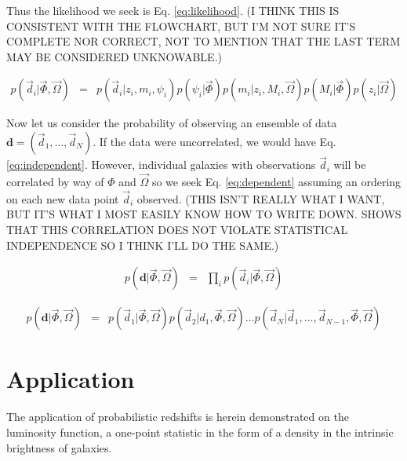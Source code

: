 \documentclass[12pt, onecolumn]{emulateapj}
\begin{document}
Thus the likelihood we seek is Eq. \ref{eq:likelihood}.  (I THINK THIS IS CONSISTENT WITH THE FLOWCHART, BUT I'M NOT SURE IT'S COMPLETE NOR CORRECT, NOT TO MENTION THAT THE LAST TERM MAY BE CONSIDERED UNKNOWABLE.)


\begin{eqnarray}
\label{eq:likelihood}
p(\vec{d}_{i}|\vec{\Phi},\vec{\Omega}) &=& p(\vec{d}_{i}|z_{i},m_{i},\psi_{i})p(\psi_{i}|\vec{\Phi})p(m_{i}|z_{i},M_{i},\vec{\Omega})p(M_{i}|\vec{\Phi})p(z_{i}|\vec{\Omega})
\end{eqnarray}

Now let us consider the probability of observing an ensemble of data $\textbf{d}=(\vec{d}_{1},\dots,\vec{d}_{N})$.  If the data were uncorrelated, we would have Eq. \ref{eq:independent}.  However, individual galaxies with observations $\vec{d}_{i}$ will be correlated by way of $\Phi$ and $\vec{\Omega}$ so we seek Eq. \ref{eq:dependent} assuming an ordering on each new data point $\vec{d}_{i}$ observed.  (THIS ISN'T REALLY WHAT I WANT, BUT IT'S WHAT I MOST EASILY KNOW HOW TO WRITE DOWN.  \citet{for14} SHOWS THAT THIS CORRELATION DOES NOT VIOLATE STATISTICAL INDEPENDENCE SO I THINK I'LL DO THE SAME.)

\begin{eqnarray}
\label{eq:independent}
p(\textbf{d}|\vec{\Phi},\vec{\Omega}) &=& \prod_{i}p(\vec{d}_{i}|\vec{\Phi},\vec{\Omega})
\end{eqnarray}

\begin{eqnarray}
\label{eq:dependent}
p(\textbf{d}|\vec{\Phi},\vec{\Omega}) &=& p(\vec{d}_{1}|\vec{\Phi},\vec{\Omega})p(\vec{d}_{2}|d_{1},\vec{\Phi},\vec{\Omega})\dots p(\vec{d}_{N}|\vec{d}_{1},\dots,\vec{d}_{N-1},\vec{\Phi},\vec{\Omega})
\end{eqnarray}

\section{Application}

The application of probabilistic redshifts is herein demonstrated on the luminosity function, a one-point statistic in the form of a density in the intrinsic brightness of galaxies.  

\end{document}
